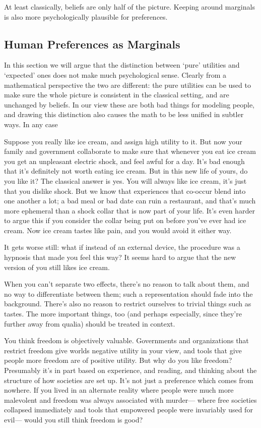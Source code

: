 \documentclass{article}
\begin{document}
	At least classically, beliefs are only half of the picture. Keeping around marginals is also more psychologically plausible for preferences.

	\subsection{Human Preferences as Marginals}	\label{sec:human-pref-marginals}
	In this section we will argue that the distinction between `pure' utilities and `expected' ones does not make much psychological sense. Clearly from a mathematical perspective the two are different: the pure utilities can be used to make sure the whole picture is consistent in the classical setting, and are unchanged by beliefs. In our view these are both bad things for modeling people, and drawing this distinction also causes the math to be less unified in subtler ways. In any case
	
	\begin{example}
		Suppose you really like ice cream, and assign high utility to it. But now your family and government collaborate to make sure that whenever you eat ice cream you get an unpleasant electric shock, and feel awful for a day. It's bad enough that it's definitely not worth eating ice cream. But in this new life of yours, do you like it? The classical answer is yes. You will always like ice cream, it's just that you dislike shock. But we know that experiences that co-occur blend into one another a lot; a bad meal or bad date can ruin a restaurant, and that's much more ephemeral than a shock collar that is now part of your life. It's even harder to argue this if you consider the collar being put on before you've ever had ice cream. Now ice cream tastes like pain, and you would avoid it either way.		
		
		It gets worse still: what if instead of an external device, the procedure was a hypnosis that made you feel this way? It seems hard to argue that the new version of you still likes ice cream.
	\end{example}

	When you can't separate two effects, there's no reason to talk about them, and no way to differentiate between them; such a representation should fade into the background. There's also no reason to restrict ourselves to trivial things such as tastes. The more important things, too (and perhaps especially, since they're further away from qualia) should be treated in context.
	
	\begin{example}
		You think freedom is objectively valuable. Governments and organizations that restrict freedom give worlds negative utility in your view, and tools that give people more freedom are of positive utility. But why do you like freedom? Presumably it's in part based on experience, and reading, and thinking about the structure of how societies are set up. It's not just a preference which comes from nowhere. If you lived in an alternate reality where people were much more malevolent and freedom was always associated with murder--- where free societies collapsed immediately and tools that empowered people were invariably used for evil--- would you still think freedom is good?
	\end{example}
\end{document}
